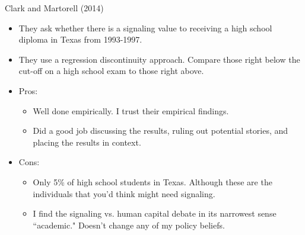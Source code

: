 \documentclass{beamer}
\begin{document}
\begin{frame}[<+->]{Clark and Martorell (2014)}
\begin{itemize}
\item They ask whether there is a signaling value to receiving a high school diploma in Texas from 1993-1997.
\item They use a regression discontinuity approach. Compare those right below the cut-off on a high school exam to those right above.
\item Pros:
	\begin{itemize}
	\item Well done empirically. I trust their empirical findings.
	\item Did a good job discussing the results, ruling out potential stories, and placing the results in context.
	\end{itemize}
\item Cons:
	\begin{itemize}
	\item Only 5\% of high school students in Texas. Although these are the individuals that you'd think might need signaling.
	\item I find the signaling vs. human capital debate in its narrowest sense ``academic." Doesn't change any of my policy beliefs.
	\end{itemize}
\end{itemize}
\end{frame}
\end{document}
